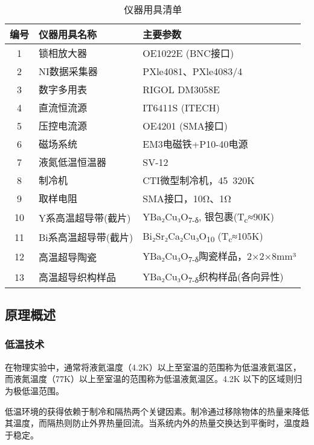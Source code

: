 \begin{table}[h!]
    \centering
    \caption{仪器用具清单}
    \label{tab:instruments}
    \begin{tabular}{cll}
        \toprule
        \textbf{编号} & \textbf{仪器用具名称} & \textbf{主要参数} \\
        \midrule
        1  & 锁相放大器           & OE1022E (BNC接口) \\
        2  & NI数据采集器         & PXle4081、PXle4083/4 \\
        3  & 数字多用表           & RIGOL DM3058E \\
        4  & 直流恒流源           & IT6411S (ITECH) \\
        5  & 压控电流源           & OE4201 (SMA接口) \\
        6  & 磁场系统             & EM3电磁铁+P10-40电源 \\
        7  & 液氮低温恒温器       & SV-12 \\
        8  & 制冷机               & CTI微型制冷机，45~320K \\
        9  & 取样电阻             & SMA接口，10Ω、1Ω \\
        10 & Y系高温超导带(截片)  & YBa₂Cu₃O\textsubscript{7-δ}, 银包裹(T\textsubscript{c}≈90K) \\
        11 & Bi系高温超导带(截片) & Bi₂Sr₂Ca₂Cu₃O\textsubscript{10} (T\textsubscript{c}≈105K) \\
        12 & 高温超导陶瓷         & YBa₂Cu₃O\textsubscript{7-δ}陶瓷样品，2×2×8mm³ \\
        13 & 高温超导织构样品     & YBa₂Cu₃O\textsubscript{7-δ}织构样品(各向异性) \\
        \bottomrule
    \end{tabular}
\end{table}

\subsection{原理概述}

\subsubsection{低温技术}
在物理实验中，通常将液氦温度（4.2K）以上至室温的范围称为低温液氦温区，而液氮温度（77K）以上至室温的范围称为低温液氮温区。4.2K 以下的区域则归为极低温范围。

低温环境的获得依赖于制冷和隔热两个关键因素。制冷通过移除物体的热量来降低其温度，而隔热则防止外界热量回流。当系统内外的热量交换达到平衡时，温度趋于稳定。

